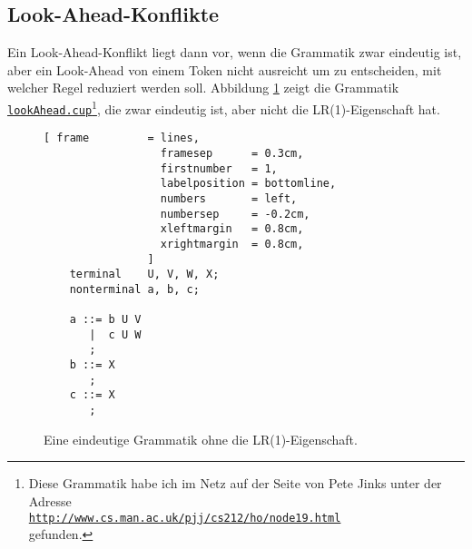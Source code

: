 \subsection{Look-Ahead-Konflikte}
Ein Look-Ahead-Konflikt liegt dann vor, wenn die Grammatik zwar eindeutig ist, aber ein Look-Ahead von einem
Token nicht ausreicht um zu entscheiden,  mit welcher Regel reduziert werden soll.  Abbildung 
\ref{fig:lr-conflict.g} zeigt die Grammatik 
\href{https://github.com/karlstroetmann/Formal-Languages/tree/master/Cup/LookAheadConflict/lookAhead.cup}{\texttt{lookAhead.cup}}\footnote{ 
Diese Grammatik habe ich im Netz auf der Seite von Pete Jinks unter der Adresse
\\[0.1cm]
\hspace*{1.3cm}
\href{http://www.cs.man.ac.uk/~pjj/cs212/ho/node19.html}{\texttt{http://www.cs.man.ac.uk/pjj/cs212/ho/node19.html}}
\\[0.1cm]
gefunden.},
die zwar eindeutig ist, aber nicht die LR(1)-Eigenschaft hat.  

\begin{figure}[!ht]
\centering
\begin{Verbatim}[ frame         = lines, 
                  framesep      = 0.3cm, 
                  firstnumber   = 1,
                  labelposition = bottomline,
                  numbers       = left,
                  numbersep     = -0.2cm,
                  xleftmargin   = 0.8cm,
                  xrightmargin  = 0.8cm,
                ]
    terminal    U, V, W, X;
    nonterminal a, b, c;

    a ::= b U V
       |  c U W
       ;    
    b ::= X
       ;
    c ::= X 
       ;
\end{Verbatim}
\vspace*{-0.3cm}
\caption{Eine eindeutige Grammatik ohne die LR(1)-Eigenschaft.}
\label{fig:lr-conflict.g}
\end{figure}


